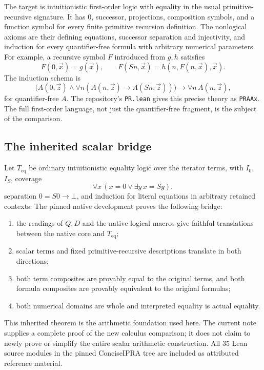 \documentclass[11pt]{article}
\theoremstyle{definition}\newtheorem{definition}[theorem]{Definition}
\theoremstyle{remark}\newtheorem{remark}[theorem]{Remark}
\newcommand{\Teq}{T_{\mathrm{eq}}}
\begin{document}
The target is intuitionistic first-order logic with equality in the
usual primitive-recursive signature. It has $0$, successor, projections,
composition symbols, and a function symbol for every finite primitive
recursion definition. The nonlogical axioms are their defining
equations, successor separation and injectivity, and induction for every
quantifier-free formula with arbitrary numerical parameters. For
example, a recursive symbol $F$ introduced from $g,h$ satisfies
\[
 F(0,\vec x)=g(\vec x),\qquad
 F(Sn,\vec x)=h(n,F(n,\vec x),\vec x).
\]
The induction schema is
\[
 \bigl(A(0,\vec z)\wedge
       \forall n(A(n,\vec z)\to A(Sn,\vec z))\bigr)
       \to\forall n\,A(n,\vec z),
\]
for quantifier-free $A$. The repository's \texttt{PR.lean} gives this
precise theory as \texttt{PRAAx}\cite{pr}. The full first-order
language, not just the quantifier-free fragment, is the subject of the
comparison.

\subsection{The inherited scalar bridge}

Let $\Teq$ be ordinary intuitionistic equality logic over the iterator
terms, with $I_0$, $I_S$, coverage
\[
 \forall x\,(x=0\vee\exists y\,x=Sy),
\]
separation $0=S0\to\bot$, and induction for literal equations in
arbitrary retained contexts. The pinned native development proves the
following bridge\cite{bridge,scalarbridge}:
\begin{enumerate}
\item the readings of $Q,D$ and the native logical macros give faithful
translations between the native core and $\Teq$;
\item scalar terms and fixed primitive-recursive descriptions translate
in both directions;
\item both term composites are provably equal to the original terms,
and both formula composites are provably equivalent to the original
formulas;
\item both numerical domains are whole and interpreted equality is
actual equality.
\end{enumerate}

This inherited theorem is the arithmetic foundation used here. The
current note supplies a complete proof of the new calculus comparison;
it does not claim to newly prove or simplify the entire scalar
arithmetic construction. All 35 Lean source modules in the pinned
ConciseIPRA tree are included as attributed reference material.
\end{document}
